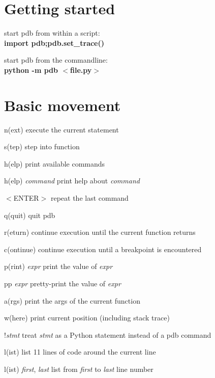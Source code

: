 \documentclass[11pt,landscape,a4paper]{article}
\newcommand{\keystroke}[1]{$<$#1$>$}
\begin{document}
  \begin{multicols}{2}
    \section{Getting started}
      start pdb from within a script:\\
      {\bfseries import pdb;pdb.set\_trace()}
      
      start pdb from the commandline:\\
      {\bfseries python -m pdb \keystroke{file.py}}
      
    \section{Basic movement}
      \begin{eqlist}
        \item[n(ext)] execute the current statement
        \item[s(tep)] step into function
        \item[h(elp)] print available commands
        \item[h(elp) \textit{command}] print help about \textit{command}
        \item[\keystroke{ENTER}] repeat the last command
        \item[q(quit)] quit pdb

        \item[r(eturn)] continue execution until the current function returns
        \item[c(ontinue)] continue execution until a breakpoint is encountered

        \item[p(rint) \textit{expr}] print the value of \textit{expr}
        \item[pp \textit{expr}] pretty-print the value of \textit{expr}
        \item[a(rgs)] print the args of the current function
        \item[w(here)] print current position (including stack trace)
        
        \item[!\textit{stmt}] treat \textit{stmt} as a Python statement instead of a pdb command

        \item[l(ist)] list 11 lines of code around the current line
        \item[l(ist) \textit{first}, \textit{last}] list from \textit{first} to \textit{last} line number
        

\end{eqlist}
\end{multicols}
\end{document}
